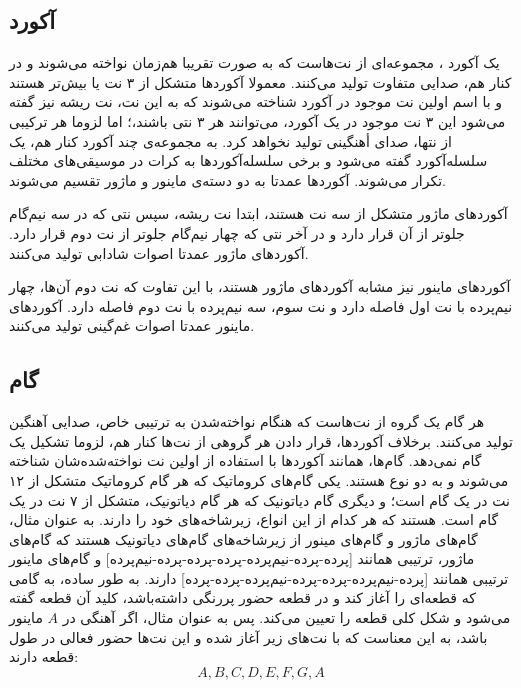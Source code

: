 \subsection{
آکورد
}

یک آکورد
، مجموعه‌ای از نت‌هاست که به صورت تقریبا هم‌زمان نواخته می‌شوند و در کنار هم، صدایی متفاوت تولید می‌کنند.
معمولا آکوردها متشکل از ۳ نت یا بیش‌تر هستند و با اسم اولین نت موجود در آکورد شناخته می‌شوند که به این نت، نت ریشه
نیز گفته می‌شود این ۳ نت موجود در یک آکورد، می‌توانند هر ۳ نتی باشند،؛ اما لزوما هر ترکیبی از نتها، صدای أهنگینی تولید نخواهد کرد.
به مجموعه‌ی چند آکورد کنار هم، یک سلسله‌آکورد
گفته می‌شود و برخی سلسله‌آکوردها به کرات در موسیقی‌های مختلف تکرار می‌شوند.
آکوردها عمدتا به دو دسته‌ی ماینور
و ماژور
تقسیم می‌شوند.

آکوردهای ماژور متشکل از سه نت هستند، ابتدا نت ریشه، سپس نتی که در سه نیم‌گام جلوتر از آن قرار دارد و در آخر نتی که چهار نیم‌گام جلوتر از نت دوم قرار دارد. آکوردهای ماژور عمدتا اصوات شادابی تولید می‌کنند.

آکوردهای ماینور نیز مشابه آکوردهای ماژور هستند، با این تفاوت که نت دوم آن‌ها، چهار نیم‌پرده با نت اول فاصله دارد و نت سوم، سه نیم‌پرده با نت دوم فاصله دارد.
آکوردهای ماینور عمدتا اصوات غم‌گینی تولید می‌کنند.

\subsection{
گام
}
هر گام
یک گروه از نت‌هاست که هنگام نواخته‌شدن به ترتیبی خاص، صدایی آهنگین تولید می‌کنند. برخلاف آکوردها، قرار دادن هر گروهی از نت‌ها کنار هم، لزوما تشکیل یک گام نمی‌دهد.
گام‌ها، همانند آکوردها با استفاده از اولین نت نواخته‌شده‌شان شناخته می‌شوند و به دو نوع هستند. یکی
گام‌های کروماتیک
که هر گام کروماتیک متشکل از ۱۲ نت در یک گام است؛
و دیگری گام دیاتونیک
که هر گام دیاتونیک، متشکل از ۷ نت در یک گام است.
هستند که هر کدام از این انواع، زیرشاخه‌های خود را دارند. به عنوان مثال، گام‌های ماژور
و گام‌های مینور
از زیرشاخه‌های گام‌های دیاتونیک هستند که گام‌های ماژور، ترتیبی همانند
[پرده-پرده-نیم‌پرده-پرده-پرده-پرده-نیم‌پرده]
و گام‌های ماینور ترتیبی همانند
[پرده-نیم‌پرده-پرده-پرده-نیم‌پرده-پرده-پرده] دارند.
به طور ساده، به گامی که قطعه‌ای را آغاز کند و در قطعه حضور پررنگی داشته‌باشد، کلید
آن قطعه گفته می‌شود و شکل کلی قطعه را تعیین می‌کند.
پس به عنوان مثال، اگر آهنگی در
$A$
ماینور باشد، به این معناست که با نت‌های زیر آغاز شده و این نت‌ها حضور فعالی در طول قطعه دارند:
\begin{equation}
    A, B, C, D, E, F, G, A
\end{equation}

